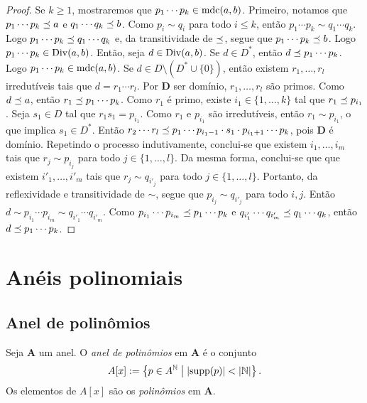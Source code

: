 \begin{proof}
Se $k \geq 1$, mostraremos que $p_1 \cdots p_k \in \operatorname{mdc}(a,b)$. Primeiro, notamos que $p_1 \cdots p_k \preceq a$ e $q_1 \cdots q_k \preceq b$. Como $p_i \sim q_i$ para todo $i \leq k$, então $p_1 \cdots p_k \sim q_1 \cdots q_k$. Logo $p_1 \cdots p_k \preceq q_1 \cdots q_k$ e, da transitividade de $\preceq$, segue que $p_1 \cdots p_k \preceq b$. Logo $p_1 \cdots p_k \in \operatorname{Div}(a,b)$. Então, seja $d \in \operatorname{Div}(a,b)$. Se $d \in D^*$, então $d \preceq p_1 \cdots p_k$. Logo $p_1 \cdots p_k \in \operatorname{mdc}(a,b)$. Se $d \in D \setminus (D^* \cup \{0\})$, então existem $r_1,\ldots,r_l$ irredutíveis tais que $d = r_1 \cdots r_l$. Por $\bm D$ ser domínio, $r_1,\ldots,r_l$ são primos. Como $d \preceq a$, então $r_1 \preceq p_1 \cdots p_k$. Como $r_1$ é primo, existe $i_1 \in \{1,\ldots,k\}$ tal que $r_1 \preceq p_{i_1}$. Seja $s_1 \in D$ tal que $r_1s_1 = p_{i_1}$. Como $r_1$ e $p_{i_1}$ são irredutíveis, então $r_1 \sim p_{i_1}$, o que implica $s_1 \in D^*$. Então $r_2 \cdots r_l \preceq p_1 \cdots p_{i_1-1} \cdot s_1 \cdot p_{i_1+1} \cdots p_k$, pois $\bm D$ é domínio. Repetindo o processo indutivamente, conclui-se que existem $i_1, \ldots,i_m$ tais que $r_j \sim p_{i_j}$ para todo $j \in \{1,\ldots,l\}$.
Da mesma forma, conclui-se que que existem $i'_1, \ldots,i'_m$ tais que $r_j \sim q_{i'_j}$ para todo $j \in \{1,\ldots,l\}$. Portanto, da reflexividade e transitividade de $\sim$, segue que $p_{i_j} \sim q_{i'_j}$ para todo $i,j$. Então $d \sim p_{i_1} \cdots p_{i_m} \sim q_{i'_1} \cdots q_{i'_m}$. Como $p_{i_1} \cdots p_{i_m} \preceq p_1 \cdots p_k$ e $q_{i'_1} \cdots q_{i'_m} \preceq q_1 \cdots q_k$, então $d \preceq p_1 \cdots p_k$.
\end{proof}







\section{Anéis polinomiais}

\subsection{Anel de polinômios}

\begin{definition}
Seja $\bm A$ um anel. O \emph{anel de polinômios} em $\bm A$ é o conjunto
	\begin{equation*}
	A[x] := \left\{{p \in A^{\mathbb{N}}}\;\middle\vert\;{\left\lvert{\operatorname{supp}(p)}\right\rvert < \left\lvert{\mathbb{N}}\right\rvert}\right\}.
	\end{equation*}
Os elementos de $A[x]$ são os \emph{polinômios} em $\bm A$.
\end{definition}

